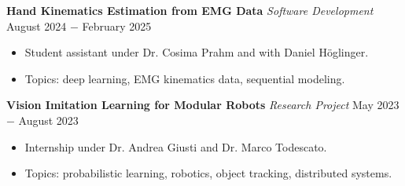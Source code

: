 \documentclass{article}
\begin{document}
\noindent \textbf{Hand Kinematics Estimation from EMG Data} \textit{Software Development} \hfill August 2024 $-$ February 2025 
\begin{itemize}[noitemsep,nolistsep,leftmargin=*]
    \item Student assistant under Dr. Cosima Prahm and with Daniel Höglinger.
    \item Topics: deep learning, EMG kinematics data, sequential modeling.\\
\end{itemize}

\noindent \textbf{Vision Imitation Learning for Modular Robots} \textit{Research Project} \href{https://github.com/RobinU434/TaskParameterizedGaussianMixtureModels}{\faGithubSquare}\hfill May 2023 $-$ August 2023
\begin{itemize}[noitemsep,nolistsep,leftmargin=*]
    \item Internship under Dr. Andrea Giusti and Dr. Marco Todescato.
    \item Topics: probabilistic learning, robotics, object tracking, distributed systems.\\
\end{itemize}
\end{document}
